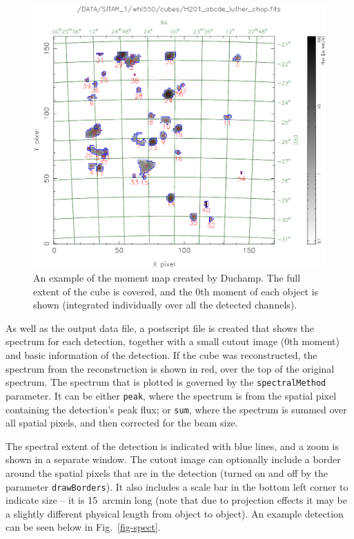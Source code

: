 \documentclass[12pt,a4paper]{article}
\begin{document}
\begin{figure}[!t]
\begin{center}
\includegraphics[width=\textwidth]{example_moment_map}
\end{center}
\caption{\footnotesize An example of the moment map created by
  Duchamp. The full extent of the cube is covered, and the 0th moment
  of each object is shown (integrated individually over all the
  detected channels).}
\label{fig-moment}
\end{figure}

As well as the output data file, a postscript file is created that
shows the spectrum for each detection, together with a small cutout
image (0th moment) and basic information of the detection. If the cube
was reconstructed, the spectrum from the reconstruction is shown in
red, over the top of the original spectrum. The spectrum that is
plotted is governed by the {\tt spectralMethod} parameter. It can be
either {\tt peak}, where the spectrum is from the spatial pixel
containing the detection's peak flux; or {\tt sum}, where the spectrum
is summed over all spatial pixels, and then corrected for the beam
size.

The spectral extent of the detection is indicated with blue lines, and
a zoom is shown in a separate window. The cutout image can optionally
include a border around the spatial pixels that are in the detection
(turned on and off by the parameter {\tt drawBorders}). It also
includes a scale bar in the bottom left corner to indicate size -- it
is 15~arcmin long (note that due to projection effects it may be a
slightly different physical length from object to object). An example
detection can be seen below in Fig.~\ref{fig-spect}.
\end{document}
